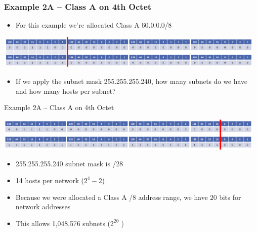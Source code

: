 \documentclass[pdflatex,compress]{beamer}
\begin{document}
\begin{frame}
	\frametitle{Example 2A – Class A on 4th Octet}
	\begin{itemize}
		\item For this example we’re allocated Class A 60.0.0.0/8
	\end{itemize}
	\begin{center}
		\includegraphics[width=\linewidth]{img/img19}
	\end{center}
	\begin{itemize}
		\item If we apply the subnet mask 255.255.255.240, how many subnets do we have and how many hosts per subnet?
	\end{itemize}
\end{frame}

\begin{frame}{Example 2A – Class A on 4th Octet}
	\begin{center}
		\includegraphics[width=\linewidth]{img/img20}
	\end{center}
	\begin{itemize}
		\item 255.255.255.240 subnet mask is /28
		\item 14 hosts per network ($ 2^4 - 2 $)
		\item Because we were allocated a Class A /8 address range, we have 20 bits for network addresses
		\item This allows 1,048,576 subnets ($ 2^{20} $ )
	\end{itemize}
\end{frame}
\end{document}
